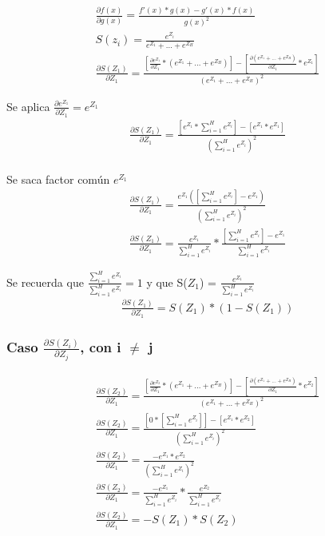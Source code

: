 \begin{gather}
	\frac{\partial f(x)}{\partial g(x)} = \frac{f'(x)*g(x) - g'(x)*f(x)}{g(x)^2} \\
	S(z_i) = \frac{e^{Z_i}}{e^{Z_1} + ... + e^{Z_H}} \\
	\frac{\partial S(Z_1)}{\partial Z_1} = \frac{[\frac{\partial e^{Z_1}}{\partial Z_1} * (e^{Z_1} + ... + e^{Z_H}) ] - [\frac{\partial (e^{Z_1} + ... + e^{Z_H})}{\partial Z_1} * e^{Z_1} ] }{(e^{Z_1} + ... + e^{Z_H})^2} 
\end{gather}

Se aplica $\frac{\partial e^{Z_1}}{\partial Z_1} = e^{Z_1}$ \\
\begin{gather}
	\frac{\partial S(Z_1)}{\partial Z_1} = \frac{[e^{Z_1} * \sum_{i=1}^{H}  e^{Z_i}] - [e^{Z_1} * e^{Z_1}]   }{ (\sum_{i=1}^{H}  e^{Z_i})^2} \\
\end{gather}

Se saca factor común $e^{Z_1}$ \\
\begin{gather}
	\frac{\partial S(Z_1)}{\partial Z_1} = \frac{e^{Z_1} ([\sum_{i=1}^{H}  e^{Z_i}] - e^{Z_1})  }{(\sum_{i=1}^{H}  e^{Z_i})^2} \\
	\frac{\partial S(Z_1)}{\partial Z_1} = \frac{e^{Z_1}}{\sum_{i=1}^{H}  e^{Z_i}} * \frac{[\sum_{i=1}^{H}  e^{Z_i}] - e^{Z_1}}{\sum_{i=1}^{H}  e^{Z_i}}
\end{gather}

Se recuerda que $\frac{\sum_{i=1}^{H}  e^{Z_i}}{\sum_{i=1}^{H}  e^{Z_i}} = 1$ y que S($Z_1$) = $ \frac{e^{Z_1}}{\sum_{i=1}^{H}  e^{Z_i}}$ \\
\begin{gather}
	\frac{\partial S(Z_1)}{\partial Z_1} = S(Z_1) * (1- S(Z_1))
	\label{grad_Oi_Zk_drch}
\end{gather}

\subsubsection{Caso $\frac{\partial S(Z_i)}{\partial Z_j}$, con i $\neq$ j}

\begin{gather}
	\frac{\partial S(Z_2)}{\partial Z_1} = \frac{[\frac{\partial e^{Z_2}}{\partial Z_1} * (e^{Z_1} + ... + e^{Z_H}) ] - [\frac{\partial (e^{Z_1} + ... + e^{Z_H})}{\partial Z_1} * e^{Z_2} ] }{(e^{Z_1} + ... + e^{Z_H})^2} \\
	\frac{\partial S(Z_2)}{\partial Z_1} = \frac{[0 * [\sum_{i=1}^{H}  e^{Z_i}]] - [e^{Z_1} * e^{Z_2}]   }{ (\sum_{i=1}^{H}  e^{Z_i})^2} \\
	\frac{\partial S(Z_2)}{\partial Z_1} = \frac{-e^{Z_1} * e^{Z_2}  }{(\sum_{i=1}^{H}  e^{Z_i})^2} \\
	\frac{\partial S(Z_2)}{\partial Z_1} = \frac{-e^{Z_1}}{\sum_{i=1}^{H}  e^{Z_i}} * \frac{e^{Z_2}}{\sum_{i=1}^{H}  e^{Z_i}} \\
	\frac{\partial S(Z_2)}{\partial Z_1} = -S(Z_1) * S(Z_2)
	\label{grad_Oi_Zk_izq}
\end{gather}

